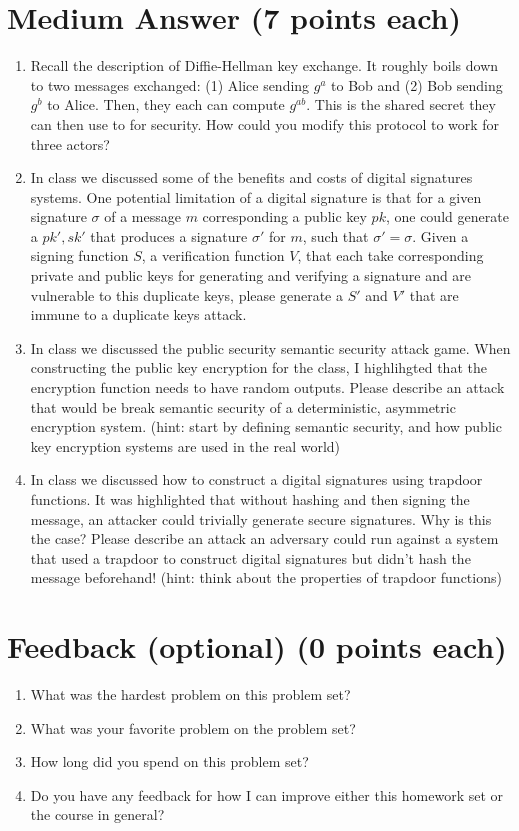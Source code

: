 \documentclass[11pt]{article}
\begin{document}
\section*{Medium Answer (7 points each)}
\begin{enumerate}    
    \item Recall the description of Diffie-Hellman key exchange. It roughly boils down to two messages exchanged: (1) Alice sending \(g^a\) to Bob and (2) Bob sending \(g^b\) to Alice. Then, they each can compute \(g^{ab}\). This is the shared secret they can then use to for security. How could you modify this protocol to work for three actors?  
    \item In class we discussed some of the benefits and costs of digital signatures systems. One potential limitation of a digital signature is that for a given signature \(\sigma\) of a message \(m\) corresponding a public key \(pk\), one could generate a \(pk', sk'\) that produces a signature \(\sigma'\) for \(m\), such that \(\sigma' = \sigma\). Given a signing function \(S\), a verification function \(V\), that each take corresponding private and public keys for generating and verifying a signature and are vulnerable to this duplicate keys, please generate a \(S'\) and \(V'\) that are immune to a duplicate keys attack.
    \item In class we discussed the public security semantic security attack game. When constructing the public key encryption for the class, I highlihgted that the encryption function needs to have random outputs. Please describe an attack that would be break semantic security of a deterministic, asymmetric encryption system. (hint: start by defining semantic security, and how public key encryption systems are used in the real world)
    \item In class we discussed how to construct a digital signatures using trapdoor functions. It was highlighted that without hashing and then signing the message, an attacker could trivially generate secure signatures. Why is this the case? Please describe an attack an adversary could run against a system that used a trapdoor to construct digital signatures but didn't hash the message beforehand! (hint: think about the properties of trapdoor functions)
\end{enumerate}

\section*{Feedback (optional) (0 points each)}

\begin{enumerate}
    \item What was the hardest problem on this problem set?
    \item What was your favorite problem on the problem set?
    \item How long did you spend on this problem set?
    \item Do you have any feedback for how I can improve either this homework set or the course in general?
\end{enumerate}
\end{document}
